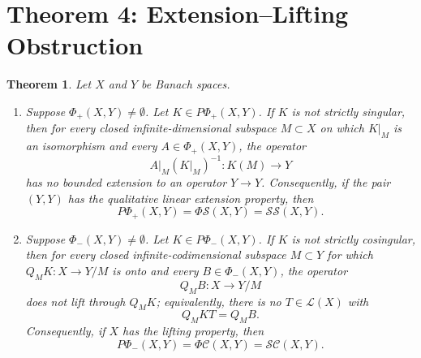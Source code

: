 \documentclass[11pt]{article}
\newtheorem{theorem}{Theorem}
\newcommand{\LL}{\mathcal L}
\newcommand{\SSing}{\mathcal{SS}}
\newcommand{\SCos}{\mathcal{SC}}
\newcommand{\PhiS}{\Phi\mathcal S}
\newcommand{\PhiC}{\Phi\mathcal C}
\begin{document}
\section*{Theorem 4: Extension--Lifting Obstruction}

\begin{theorem}
Let \(X\) and \(Y\) be Banach spaces.
\begin{enumerate}
\item Suppose \(\Phi_+(X,Y)\neq\emptyset\).  Let \(K\in P\Phi_+(X,Y)\).
If \(K\) is not strictly singular, then for every closed
infinite-dimensional subspace \(M\subset X\) on which \(K|_M\) is an
isomorphism and every \(A\in\Phi_+(X,Y)\), the operator
\[
A|_M (K|_M)^{-1}:K(M)\longrightarrow Y
\]
has no bounded extension to an operator \(Y\to Y\).  Consequently, if the
pair \((Y,Y)\) has the qualitative linear extension property, then
\[
P\Phi_+(X,Y)=\PhiS(X,Y)=\SSing(X,Y).
\]

\item Suppose \(\Phi_-(X,Y)\neq\emptyset\).  Let \(K\in P\Phi_-(X,Y)\).
If \(K\) is not strictly cosingular, then for every closed
infinite-codimensional subspace \(M\subset Y\) for which
\(Q_MK:X\to Y/M\) is onto and every \(B\in\Phi_-(X,Y)\), the operator
\[
Q_MB:X\longrightarrow Y/M
\]
does not lift through \(Q_MK\); equivalently, there is no \(T\in\LL(X)\) with
\[
Q_MKT=Q_MB.
\]
Consequently, if \(X\) has the lifting property, then
\[
P\Phi_-(X,Y)=\PhiC(X,Y)=\SCos(X,Y).
\]
\end{enumerate}
\end{theorem}
\end{document}
